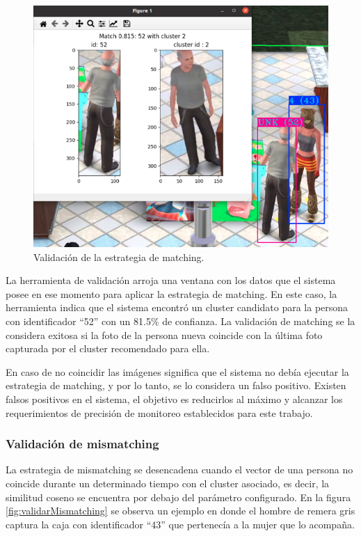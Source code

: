 \begin{figure}[ht]
	\centering
	\includegraphics[scale=.7]{./Figures/validarMatching.png}
	\caption{Validación de la estrategia de matching.}
	\label{fig:validarMatching}
\end{figure}

La herramienta de validación arroja una ventana con los datos que el sistema posee en ese momento para aplicar la estrategia de matching. En este caso, la herramienta indica que el sistema encontró un cluster candidato para la persona con identificador ``52'' con un 81.5\% de confianza. La validación de matching se la considera exitosa si la foto de la persona nueva coincide con la última foto capturada por el cluster recomendado para ella. 

En caso de no coincidir las imágenes significa que el sistema no debía ejecutar la estrategia de matching, y por lo tanto, se lo considera un falso positivo. Existen falsos positivos en el sistema, el objetivo es reducirlos al máximo y alcanzar los requerimientos de precisión de monitoreo establecidos para este trabajo.

\newpage

\subsubsection{Validación de mismatching}

La estrategia de mismatching se desencadena cuando el vector de una persona no coincide durante un determinado tiempo con el cluster asociado, es decir, la similitud coseno se encuentra por debajo del parámetro configurado. En la figura \ref{fig:validarMismatching} se observa un ejemplo en donde el hombre de remera gris captura la caja con identificador ``43'' que pertenecía a la mujer que lo acompaña.

